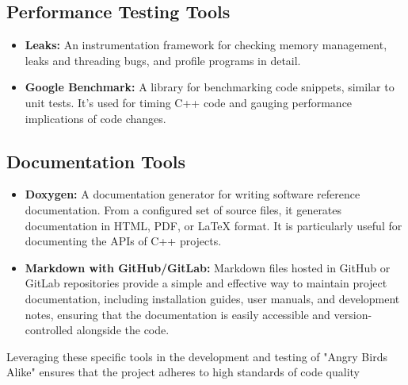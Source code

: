 \documentclass[12pt]{article}
\begin{document}
\subsection{Performance Testing Tools}
\begin{itemize}
    \item \textbf{Leaks:} An instrumentation framework for checking  memory management, leaks and threading bugs, and profile programs in detail.
    \item \textbf{Google Benchmark:} A library for benchmarking code snippets, similar to unit tests. It's used for timing C++ code and gauging performance implications of code changes.
\end{itemize}

\subsection{Documentation Tools}
\begin{itemize}
    \item \textbf{Doxygen:} A documentation generator for writing software reference documentation. From a configured set of source files, it generates documentation in HTML, PDF, or LaTeX format. It is particularly useful for documenting the APIs of C++ projects.
    \item \textbf{Markdown with GitHub/GitLab:} Markdown files hosted in GitHub or GitLab repositories provide a simple and effective way to maintain project documentation, including installation guides, user manuals, and development notes, ensuring that the documentation is easily accessible and version-controlled alongside the code.
\end{itemize}

Leveraging these specific tools in the development and testing of "Angry Birds Alike" ensures that the project adheres to high standards of code quality
\end{document}
